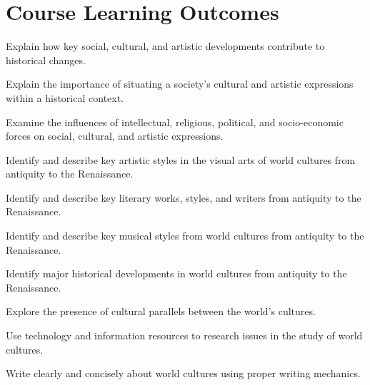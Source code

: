 \documentclass{article}
\begin{document}
\section*{Course Learning Outcomes}
\begin{enumerate*}
	\item Explain how key social, cultural, and artistic developments contribute to historical changes.
	\item Explain the importance of situating a society's cultural and artistic expressions within a historical context.
	\item Examine the influences of intellectual, religious, political, and socio-economic forces on social, cultural, and artistic expressions.
	\item Identify and describe key artistic styles in the visual arts of world cultures from antiquity to the Renaissance.
	\item Identify and describe key literary works, styles, and writers from antiquity to the Renaissance.
	\item Identify and describe key musical styles from world cultures from antiquity to the Renaissance.
	\item Identify major historical developments in world cultures from antiquity to the Renaissance.
	\item Explore the presence of cultural parallels between the world's cultures.
	\item Use technology and information resources to research issues in the study of world cultures.
	\item Write clearly and concisely about world cultures using proper writing mechanics.
\end{enumerate*}











\end{document}
